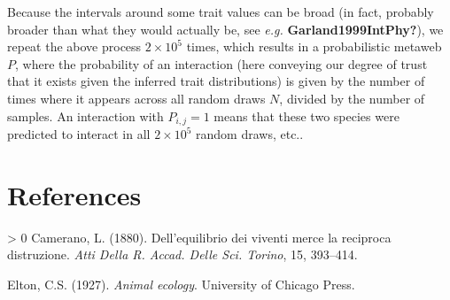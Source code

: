 \documentclass[11pt]{article}
\newlength{\cslhangindent}
\newenvironment{CSLReferences}[3] %
 {%
  \setlength{\parindent}{0pt}
  \ifodd #1 \everypar{\setlength{\hangindent}{\cslhangindent}}\ignorespaces\fi
  \ifnum #2 > 0
  \setlength{\parskip}{#2\baselineskip}
  \fi
 }%
 {}
\begin{document}
Because the intervals around some trait values can be broad (in fact,
probably broader than what they would actually be, see \emph{e.g.}
\textbf{Garland1999IntPhy?}), we repeat the above process
\(2\times 10^5\) times, which results in a probabilistic metaweb \(P\),
where the probability of an interaction (here conveying our degree of
trust that it exists given the inferred trait distributions) is given by
the number of times where it appears across all random draws \(N\),
divided by the number of samples. An interaction with \(P_{i,j} = 1\)
means that these two species were predicted to interact in all
\(2\times 10^5\) random draws, etc..

\hypertarget{references}{%
\section*{References}\label{references}}

\hypertarget{refs}{}
\begin{CSLReferences}{1}{0}
\leavevmode\hypertarget{ref-Camerano1880EquViv}{}%
Camerano, L. (1880). Dell'equilibrio dei viventi merce la reciproca
distruzione. \emph{Atti Della R. Accad. Delle Sci. Torino}, 15,
393--414.

\leavevmode\hypertarget{ref-Elton1927AniEco}{}%
Elton, C.S. (1927). \emph{Animal ecology}. University of Chicago Press.

\end{CSLReferences}
\end{document}
